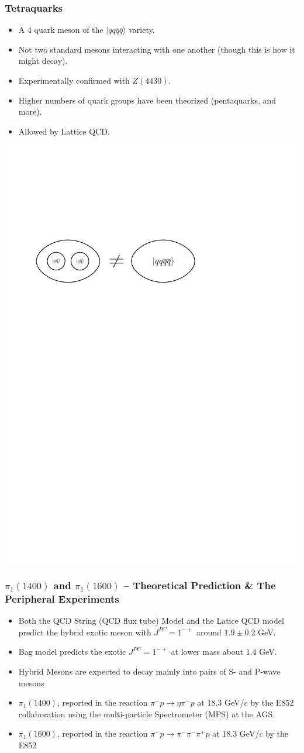 \documentclass[mathserif,18pt,xcolor=table]{beamer}
\begin{document}
\begin{frame}
  \frametitle{Tetraquarks}
  \begin{itemize}
  \item A 4 quark meson of the $|qq\overline{q}\overline{q}\rangle$ variety.
  \item Not two standard mesons interacting with one another (though this is how it might decay).
  \item Experimentally confirmed with $Z(4430)$.
  \item Higher numbers of quark groups have been theorized (pentaquarks, and more).
  \item Allowed by Lattice QCD.
  \end{itemize}
  \begin{center}
    \includegraphics[width=.7\linewidth]{../figures/tetra.pdf}
  \end{center}
\end{frame}

\begin{frame}
  \frametitle{$\pi_1(1400)$ and $\pi_1(1600)$ -- Theoretical Prediction \& The Peripheral Experiments}
  \begin{itemize}
  \item Both the QCD String (QCD flux tube) Model and the Latice QCD model predict the hybrid exotic meson with $J^{PC}=1^{-+}$ around $1.9\pm 0.2$ GeV.
  \item Bag model predicts the exotic $J^{PC} = 1^{-+}$ at lower mass about $1.4$ GeV.
  \item Hybrid Mesons are expected to decay mainly into pairs of S- and P-wave mesons
  \item $\pi_1(1400)$, reported in the reaction $\pi^− p \rightarrow \eta \pi^− p$ at 18.3 GeV/$c$ by the E852 collaboration using the multi-particle Spectrometer (MPS) at the AGS.
  \item $\pi_1(1600)$, reported in the reaction $\pi^- p \rightarrow \pi^- \pi^- \pi^+ p$ at 18.3 GeV/$c$ by the E852
  \end{itemize}
\end{frame}
\end{document}
